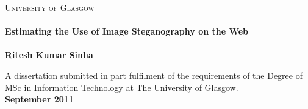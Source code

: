 \begin{titlepage}
\begin{center}



\textsc{\LARGE University of Glasgow}\\[1.5cm]



\HRule \\[0.4cm]
{ \huge \bfseries Estimating the Use of Image Steganography on the Web}\\[0.4cm]

\HRule \\[1.5cm]

{\large \bfseries \vspace{20mm} Ritesh Kumar Sinha }

\vfill

{\large A dissertation submitted in part fulfilment of the requirements of 
the Degree of MSc in Information Technology at The University of 
Glasgow.\\ 
\vspace{10 mm} 
\bfseries September 2011}

\end{center}


\end{titlepage}


